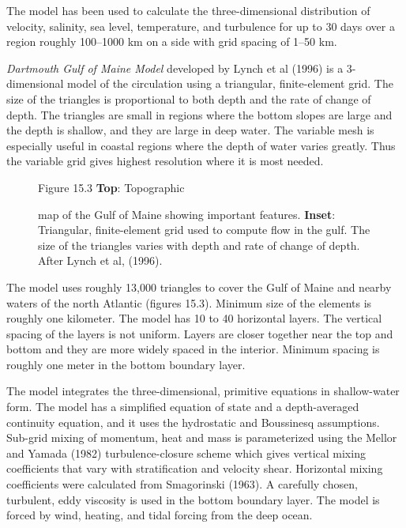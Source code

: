 The model has been used to calculate the three-dimensional distribution of
velocity, salinity, sea level, temperature, and turbulence for
up to 30 days over a region roughly 100--1000 km on a side with grid spacing of 1--50 km.

\textit{Dartmouth Gulf of Maine Model} developed by Lynch et al (1996) is a  3-dimensional model of the circulation
using a triangular, finite-element grid. The size of the triangles is proportional to both
depth and the rate of change of depth. The triangles are small in regions where the bottom
slopes are large and the depth is shallow, and they are large in deep water. The variable mesh
is especially useful in coastal regions where the depth of water varies greatly. Thus the
variable grid gives highest resolution where it is most needed.

\begin{figure}[t!]
\footnotesize
Figure 15.3 \textbf{Top}: Topographic \rule{0mm}{3ex}map of the Gulf of Maine showing
important features. \textbf{Inset}: Triangular, finite-element grid used
to compute flow in the gulf. The size of the triangles varies
with depth and rate of change of depth. After Lynch et al, (1996).
\vspace{-3ex}
\label{fig:GulfofMaine}
\end{figure}

The model uses roughly 13,000 triangles to cover the Gulf of Maine and nearby waters of the
north Atlantic (figures 15.3). Minimum size of the elements is roughly one kilometer. The
model has 10 to 40 horizontal layers. The vertical spacing of the layers is not uniform.
Layers are closer together near the top and bottom and they are more widely spaced in the
interior. Minimum spacing is roughly one meter in the bottom boundary layer.

The model integrates the three-dimensional, primitive equations in
shallow-water form. The model has a simplified equation of state and a
depth-averaged continuity equation, and it uses the hydrostatic and Boussinesq
assumptions. Sub-grid mixing of momentum, heat and mass is parameterized using the Mellor
and Yamada (1982) turbulence-closure scheme which gives
vertical mixing coefficients that vary with stratification
and velocity shear. Horizontal mixing
coefficients were calculated from Smagorinski (1963). A carefully chosen, turbulent, eddy
viscosity is used in the bottom boundary layer. The model is forced by wind, heating, and
tidal forcing from the deep ocean.

